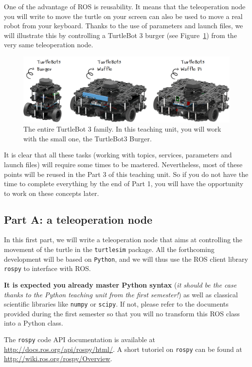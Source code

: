 \documentclass[10pt,a4paper,printanswers]{upmc}
\newcommand{\subsecline}{\texorpdfstring{\hrulefill}{}}
\begin{document}
One of the advantage of ROS is reusability. It means that the teleoperation node you will write to
move the turtle on your screen can also be used to move a real robot from your keyboard. Thanks to
the use of parameters and launch files, we will illustrate this by controlling a TurtleBot 3 burger
(see Figure~\ref{fig:turtlebot_family}) from the very same teleoperation node.

\begin{figure}[!h]
  \includegraphics[width=\linewidth]{figures/turtlebot3_models.png}
  \caption{The entire TurtleBot 3 family. In this teaching unit, you will work with the small one,
    the TurtleBot3 Burger.}
  \label{fig:turtlebot_family}
\end{figure}

\begin{mdframed}[style=graybox]
  It is clear that all these tasks (working with topics, services, parameters and launch files) will
  require some times to be mastered. Nevertheless, most of these points will be reused in the Part 3
  of this teaching unit. So if you do not have the time to complete everything by the end of
  Part 1, you will have the opportunity to work on these concepts later.
\end{mdframed}

\subsection{Part A: a teleoperation node \subsecline}
\label{subsec:teleop_node}

In this first part, we will write a teleoperation node that aims at controlling the movement of the
turtle in the \texttt{turtlesim} package. All the forthcoming development will be based on
\texttt{Python}, and we will thus use the ROS client library \texttt{rospy} to interface with ROS.

\begin{mdframed}[style=graybox]
  \textbf{It is expected you already master Python syntax} (\textit{it should be the case thanks to
    the Python teaching unit from the first semester!}) as well as classical scientific libraries
  like \texttt{numpy} or \texttt{scipy}. If not, please refer to the documents provided during the
  first semester so that you will no transform this ROS class into a Python class.

  The \texttt{rospy} code API documentation is available at
  \url{http://docs.ros.org/api/rospy/html/}. A short tutoriel on \texttt{rospy} can be found at
  \url{http://wiki.ros.org/rospy/Overview}.
\end{mdframed}
\end{document}
